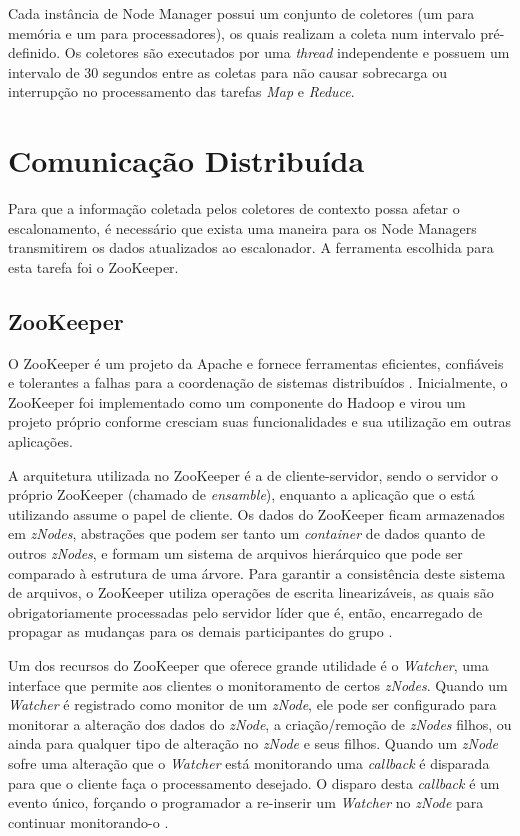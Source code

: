Cada instância de Node Manager possui um conjunto de coletores (um para memória e um para processadores), os quais realizam a coleta num intervalo pré-definido. Os coletores são executados por uma \textit{thread} independente e possuem um intervalo de 30 segundos entre as coletas para não causar sobrecarga ou interrupção no  processamento das tarefas \textit{Map} e \textit{Reduce}.

\section{Comunicação Distribuída}
\label{sec:zookeeper}

Para que a informação coletada pelos coletores de contexto possa afetar o escalonamento, é necessário que exista uma maneira para os Node Managers transmitirem os dados atualizados ao escalonador. A ferramenta escolhida para esta tarefa foi o ZooKeeper.

\subsection{ZooKeeper}
O ZooKeeper é um projeto da Apache e fornece ferramentas eficientes, confiáveis e tolerantes a falhas para a coordenação de sistemas distribuídos \cite{Hunt2010}. Inicialmente, o ZooKeeper foi implementado como um componente do Hadoop e virou um projeto próprio conforme cresciam suas funcionalidades e sua utilização em outras aplicações. 

A arquitetura utilizada no ZooKeeper é a de cliente-servidor, sendo o servidor o próprio ZooKeeper (chamado de \textit{ensamble}), enquanto a aplicação que o está utilizando assume o papel de cliente. Os dados do ZooKeeper ficam armazenados em \textit{zNodes}, abstrações que podem ser tanto um \textit{container} de dados quanto de outros \textit{zNodes}, e formam um sistema de arquivos hierárquico que pode ser comparado à estrutura de uma árvore. Para garantir a consistência deste sistema de arquivos, o ZooKeeper utiliza operações de escrita linearizáveis, as quais são obrigatoriamente processadas pelo servidor líder que é, então, encarregado de propagar as mudanças para os demais participantes do grupo \cite{Pham}.

Um dos recursos do ZooKeeper que oferece grande utilidade é o \textit{Watcher}, uma interface que permite aos clientes o monitoramento de certos \textit{zNodes}. Quando um \textit{Watcher} é registrado como monitor de um \textit{zNode}, ele pode ser configurado para monitorar a alteração dos dados do \textit{zNode}, a criação/remoção de \textit{zNodes} filhos, ou ainda para qualquer tipo de alteração no \textit{zNode} e seus filhos. Quando um \textit{zNode} sofre uma alteração que o \textit{Watcher} está monitorando uma \textit{callback} é disparada para que o cliente faça o processamento desejado. O disparo desta \textit{callback} é um evento único, forçando o programador a re-inserir um \textit{Watcher} no \textit{zNode} para continuar monitorando-o \cite{BookHadoop}.

